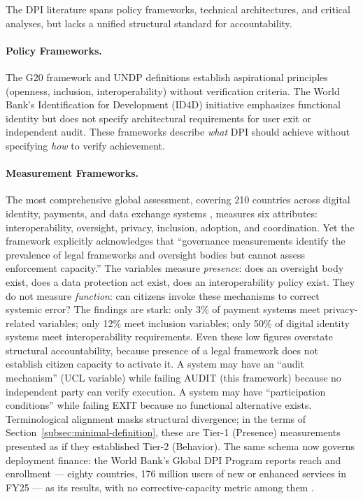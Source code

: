 \documentclass{article}
\begin{document}
The DPI literature spans policy frameworks, technical architectures, and critical analyses, but lacks a unified structural standard for accountability.

\paragraph{Policy Frameworks.} The G20 framework \citep{g20} and UNDP definitions \citep{undp} establish aspirational principles (openness, inclusion, interoperability) without verification criteria. The World Bank's Identification for Development (ID4D) initiative emphasizes functional identity but does not specify architectural requirements for user exit or independent audit. These frameworks describe \textit{what} DPI should achieve without specifying \textit{how} to verify achievement.

\paragraph{Measurement Frameworks.} The most comprehensive global assessment, covering 210 countries across digital identity, payments, and data exchange systems \citep{ucl2025}, measures six attributes: interoperability, oversight, privacy, inclusion, adoption, and coordination. Yet the framework explicitly acknowledges that ``governance measurements identify the prevalence of legal frameworks and oversight bodies but cannot assess enforcement capacity.'' The variables measure \textit{presence}: does an oversight body exist, does a data protection act exist, does an interoperability policy exist. They do not measure \textit{function}: can citizens invoke these mechanisms to correct systemic error? The findings are stark: only 3\% of payment systems meet privacy-related variables; only 12\% meet inclusion variables; only 50\% of digital identity systems meet interoperability requirements. Even these low figures overstate structural accountability, because presence of a legal framework does not establish citizen capacity to activate it. A system may have an ``audit mechanism'' (UCL variable) while failing AUDIT (this framework) because no independent party can verify execution. A system may have ``participation conditions'' while failing EXIT because no functional alternative exists. Terminological alignment masks structural divergence; in the terms of Section~\ref{subsec:minimal-definition}, these are Tier-1 (Presence) measurements presented as if they established Tier-2 (Behavior). The same schema now governs deployment finance: the World Bank's Global DPI Program reports reach and enrollment --- eighty countries, 176 million users of new or enhanced services in FY25 --- as its results, with no corrective-capacity metric among them \citep{worldbank2026gdpi}.
\end{document}
